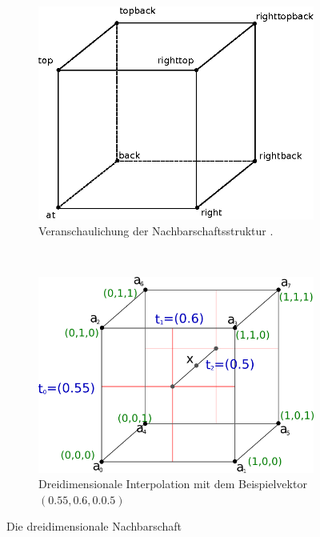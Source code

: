 \begin{figure}
	\begin{subfigure}[t]{0.5\textwidth}
		\centering
		\includegraphics[width=\textwidth]{images/right_neighborhood}
                \caption{Veranschaulichung der Nachbarschaftsstruktur .}
\label{fig:implementation_right_neighbors}
	\end{subfigure}
    ~
	\begin{subfigure}[t]{0.5\textwidth}
		\centering
		\includegraphics[width=\textwidth]{images/ndinterpolation}
		\caption{Dreidimensionale Interpolation mit dem Beispielvektor $(0.55,0.6,0.0.5)$}
\label{fig:implementation_wind_interpolation}
	\end{subfigure}
	\caption{Die dreidimensionale Nachbarschaft }
\end{figure}

